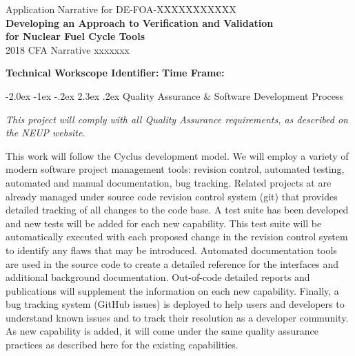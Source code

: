 \documentclass[dvips,12pt]{article}
\makeatletter
\renewcommand\section{\@startsection {section}{1}{\z@}%
                                   {-2.0ex \@plus -1ex \@minus -.2ex}%
                                   {2.3ex \@plus.2ex}%
                                   {\normalfont\bfseries}}%
\makeatother
\begin{document}
\begin{centering} Application Narrative for
  DE-FOA-XXXXXXXXXXX\\
  \textbf{\large Developing an Approach to Verification and Validation\\ for Nuclear Fuel Cycle Tools}\\
  2018 CFA Narrative xxxxxxx\\
\end{centering}

\vspace{1em}

\noindent\textbf{Technical Workscope Identifier:}  \hspace{1.5in}
\textbf{Time Frame:}








\section{Quality Assurance \& Software Development Process}

\textit{This project will comply with all Quality Assurance requirements, as
described on the NEUP website.}

This work will follow the Cyclus development model.  We will employ a variety of
modern software project management tools: revision control, automated testing,
automated and manual documentation, bug tracking. Related projects at are
already managed under source code revision control system (git) that provides
detailed tracking of all changes to the code base. A test suite has been
developed and new tests will be added for each new capability. This test suite
will be automatically executed with each proposed change in the revision control
system to identify any flaws that may be introduced. Automated documentation
tools are used in the source code to create a detailed reference for the
interfaces and additional background documentation. Out-of-code detailed reports
and publications will supplement the information on each new capability.
Finally, a bug tracking system (GitHub issues) is deployed to help users and
developers to understand known issues and to track their resolution as a
developer community. As new capability is added, it will come under the same
quality assurance practices as described here for the existing capabilities.







\label{LastPage} 
\end{document}
